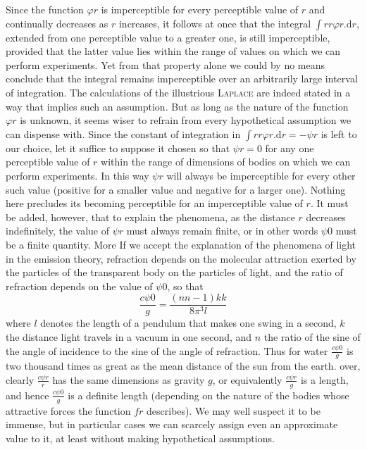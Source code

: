 Since the function $\varphi r$ is imperceptible for every perceptible value of $r$ and continually decreases as $r$ increases, it follows at once that the integral $\int rr\varphi r.\mathrm{d}r$, extended from one perceptible value to a greater one, is still imperceptible, provided that the latter value lies within the range of values on which we can perform experiments. Yet from that property alone we could by no means conclude that the integral remains imperceptible over an arbitrarily large interval of integration. The calculations of the illustrious \textsc{Laplace} are indeed stated in a way that implies such an assumption. But as long as the nature of the function $\varphi r$ is unknown, it seems wiser to refrain from every hypothetical assumption we can dispense with. Since the constant of integration in $\int rr\varphi r.\mathrm{d}r=-\psi r$ is left to our choice, let it suffice to suppose it chosen so that $\psi r=0$ for any one perceptible value of $r$ within the range of dimensions of bodies on which we can perform experiments. In this way $\psi r$ will always be imperceptible for every other such value (positive for a smaller value and negative for a larger one). Nothing here precludes its becoming perceptible for an imperceptible value of $r$. It must be added, however, that to explain the phenomena, as the distance $r$ decreases indefinitely, the value of $\psi r$ must always remain finite, or in other words $\psi0$ must be a finite quantity. More%
\newcommand{\NearTau}{\mathord{\text{\fontspec{Liberation Serif}τ}}}%
\expandafter\def\csname HistoricalNoteText6\endcsname{If we accept the explanation of the phenomena of light in the emission theory, refraction depends on the molecular attraction exerted by the particles of the transparent body on the particles of light, and the ratio of refraction depends on the value of $\psi0$, so that
\[
\frac{c\psi0}{g}=\frac{(nn-1)kk}{8\pi^3l}
\]
where $l$ denotes the length of a pendulum that makes one swing in a second, $k$ the distance light travels in a vacuum in one second, and $n$ the ratio of the sine of the angle of incidence to the sine of the angle of refraction. Thus for water $\frac{c\psi0}{g}$ is two thousand times as great as the mean distance of the sun from the earth.}%
over, clearly $\frac{c\psi r}{r}$ has the same dimensions as gravity $g$, or equivalently $\frac{c\psi r}{g}$ is a length, and hence $\frac{c\psi0}{g}$ is a definite length (depending on the nature of the bodies whose attractive forces the function $fr$ describes). We may well suspect it to be immense, but in particular cases we can scarcely assign even an approximate value to it, at least without making hypothetical assumptions.

